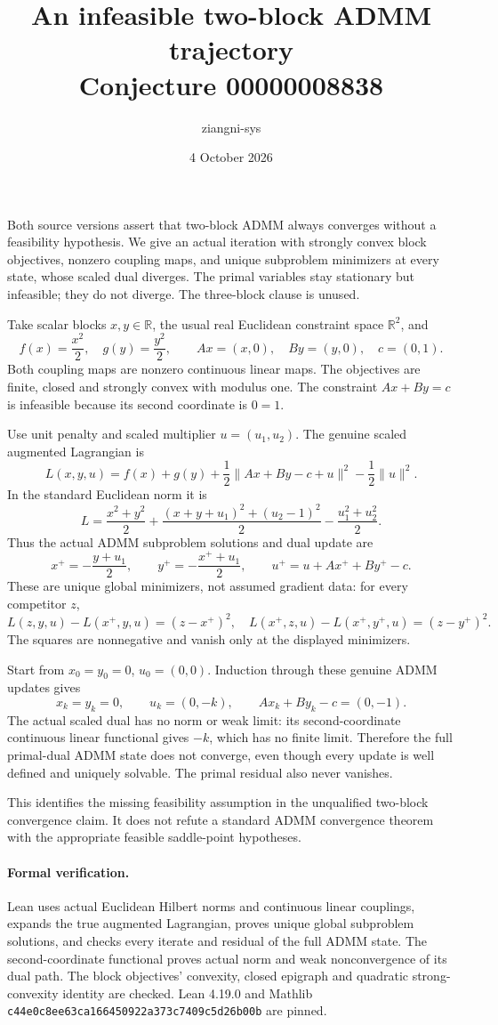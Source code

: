 \documentclass[11pt]{article}
\title{An infeasible two-block ADMM trajectory\\Conjecture 00000008838}
\author{ziangni-sys}
\date{4 October 2026}
\begin{document}
\maketitle
Both source versions assert that two-block ADMM always converges without a feasibility hypothesis. We give an actual iteration with strongly convex block objectives, nonzero coupling maps, and unique subproblem minimizers at every state, whose scaled dual diverges. The primal variables stay stationary but infeasible; they do not diverge. The three-block clause is unused.

Take scalar blocks $x,y\in\mathbb R$, the usual real Euclidean constraint space $\mathbb R^2$, and
\[
f(x)=\frac{x^2}{2},\quad g(y)=\frac{y^2}{2},\qquad
Ax=(x,0),\quad By=(y,0),\quad c=(0,1).
\]
Both coupling maps are nonzero continuous linear maps. The objectives are finite, closed and strongly convex with modulus one. The constraint $Ax+By=c$ is infeasible because its second coordinate is $0=1$.

Use unit penalty and scaled multiplier $u=(u_1,u_2)$. The genuine scaled augmented Lagrangian is
\[
L(x,y,u)=f(x)+g(y)+\frac12\|Ax+By-c+u\|^2-\frac12\|u\|^2.
\]
In the standard Euclidean norm it is
\[
L=\frac{x^2+y^2}{2}+\frac{(x+y+u_1)^2+(u_2-1)^2}{2}
-\frac{u_1^2+u_2^2}{2}.
\]
Thus the actual ADMM subproblem solutions and dual update are
\[
x^+=-\frac{y+u_1}{2},\qquad
 y^+=-\frac{x^++u_1}{2},\qquad
 u^+=u+Ax^++By^+-c.
\]
These are unique global minimizers, not assumed gradient data: for every competitor $z$,
\[
L(z,y,u)-L(x^+,y,u)=(z-x^+)^2,
\quad L(x^+,z,u)-L(x^+,y^+,u)=(z-y^+)^2.
\]
The squares are nonnegative and vanish only at the displayed minimizers.

Start from $x_0=y_0=0$, $u_0=(0,0)$. Induction through these genuine ADMM updates gives
\[
x_k=y_k=0,\qquad u_k=(0,-k),\qquad Ax_k+By_k-c=(0,-1).
\]
The actual scaled dual has no norm or weak limit: its second-coordinate continuous linear functional gives $-k$, which has no finite limit. Therefore the full primal-dual ADMM state does not converge, even though every update is well defined and uniquely solvable. The primal residual also never vanishes.

This identifies the missing feasibility assumption in the unqualified two-block convergence claim. It does not refute a standard ADMM convergence theorem with the appropriate feasible saddle-point hypotheses.

\paragraph{Formal verification.}
Lean uses actual Euclidean Hilbert norms and continuous linear couplings, expands the true augmented Lagrangian, proves unique global subproblem solutions, and checks every iterate and residual of the full ADMM state. The second-coordinate functional proves actual norm and weak nonconvergence of its dual path. The block objectives' convexity, closed epigraph and quadratic strong-convexity identity are checked. Lean 4.19.0 and Mathlib \texttt{c44e0c8ee63ca166450922a373c7409c5d26b00b} are pinned.
\end{document}
